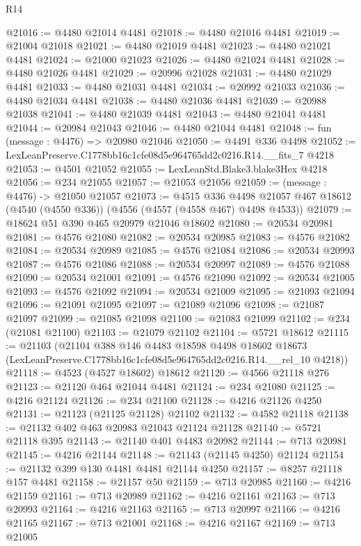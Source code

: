 \begin{lexlean}{R14}
\begin{coremodule}
@21016 := @4480 @21014 @4481
@21018 := @4480 @21016 @4481
@21019 := @21004 @21018
@21021 := @4480 @21019 @4481
@21023 := @4480 @21021 @4481
@21024 := @21000 @21023
@21026 := @4480 @21024 @4481
@21028 := @4480 @21026 @4481
@21029 := @20996 @21028
@21031 := @4480 @21029 @4481
@21033 := @4480 @21031 @4481
@21034 := @20992 @21033
@21036 := @4480 @21034 @4481
@21038 := @4480 @21036 @4481
@21039 := @20988 @21038
@21041 := @4480 @21039 @4481
@21043 := @4480 @21041 @4481
@21044 := @20984 @21043
@21046 := @4480 @21044 @4481
@21048 := fun (message : @4476) => @20980 @21046
@21050 := @4491 @336 @4498
@21052 := LexLeanPreserve.C1778bb16c1cfe08d5e964765dd2c0216.R14.__fits_7 @4218
@21053 := @4501 @21052
@21055 := LexLeanStd.Blake3.blake3Hex @4218
@21056 := @234 @21055
@21057 := @21053 @21056
@21059 := (message : @4476) -> @21050 @21057
@21073 := @4515
    @336
    @4498
    @21057
    @467
    @18612
    (@4540 (@4550 @336))
    (@4556 (@4557 (@4558 @467) @4498 @4533))
@21079 := @18624 @51 @390 @465 @20979 @21046 @18602
@21080 := @20534 @20981
@21081 := @4576 @21080
@21082 := @20534 @20985
@21083 := @4576 @21082
@21084 := @20534 @20989
@21085 := @4576 @21084
@21086 := @20534 @20993
@21087 := @4576 @21086
@21088 := @20534 @20997
@21089 := @4576 @21088
@21090 := @20534 @21001
@21091 := @4576 @21090
@21092 := @20534 @21005
@21093 := @4576 @21092
@21094 := @20534 @21009
@21095 := @21093 @21094
@21096 := @21091 @21095
@21097 := @21089 @21096
@21098 := @21087 @21097
@21099 := @21085 @21098
@21100 := @21083 @21099
@21102 := @234 (@21081 @21100)
@21103 := @21079 @21102
@21104 := @5721 @18612
@21115 := @21103
    (@21104
      @388
      @146
      @4483
      @18598
      @4498
      @18602
      @18673
      (LexLeanPreserve.C1778bb16c1cfe08d5e964765dd2c0216.R14.__rel_10 @4218))
@21118 := @4523 (@4527 @18602) @18612
@21120 := @4566 @21118 @276
@21123 := @21120 @464 @21044 @4481
@21124 := @234 @21080
@21125 := @4216 @21124
@21126 := @234 @21100
@21128 := @4216 @21126 @4250
@21131 := @21123 (@21125 @21128) @21102
@21132 := @4582 @21118
@21138 := @21132 @402 @463 @20983 @21043 @21124 @21128
@21140 := @5721 @21118 @395
@21143 := @21140 @401 @4483 @20982
@21144 := @713 @20981
@21145 := @4216 @21144
@21148 := @21143 (@21145 @4250) @21124
@21154 := @21132 @399 @130 @4481 @4481 @21144 @4250
@21157 := @8257 @21118 @157 @4481
@21158 := @21157 @50
@21159 := @713 @20985
@21160 := @4216 @21159
@21161 := @713 @20989
@21162 := @4216 @21161
@21163 := @713 @20993
@21164 := @4216 @21163
@21165 := @713 @20997
@21166 := @4216 @21165
@21167 := @713 @21001
@21168 := @4216 @21167
@21169 := @713 @21005

\end{coremodule}
\end{lexlean}
